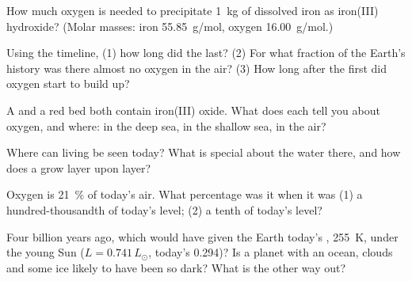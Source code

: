 \begin{exercise}[$\star\star$]\label{exo:g12:early-earth:7}
How much oxygen is needed to precipitate \qty{1}{kg} of dissolved iron as
iron(III) hydroxide? (Molar masses: iron \qty{55.85}{g/mol}, oxygen
\qty{16.00}{g/mol}.)
\end{exercise}

\begin{exercise}[$\star\star$]\label{exo:g12:early-earth:8}
Using the timeline, (1) how long did the  last? (2)
For what fraction of the Earth's history was there almost no oxygen in the
air? (3) How long after the first  did oxygen start to build up?
\end{exercise}

\begin{exercise}[$\star\star$]\label{exo:g12:early-earth:9}
A  and a red bed both contain iron(III) oxide. What
does each tell you about oxygen, and where: in the deep sea, in the shallow
sea, in the air?
\end{exercise}

\begin{exercise}[$\star\star$]\label{exo:g12:early-earth:10}
Where can living  be seen today? What is special about the
water there, and how does a  grow layer upon layer?
\end{exercise}

\begin{exercise}[$\star\star$]\label{exo:g12:early-earth:11}
Oxygen is \qty{21}{\percent} of today's air. What percentage was it when it
was (1) a hundred-thousandth of today's level; (2) a tenth of today's level?
\end{exercise}

\begin{exercise}[$\star\star\star$]\label{exo:g12:early-earth:12}
Four billion years ago, which  would have given the Earth today's
, \qty{255}{K}, under the young Sun ($L = 0.741\,L_\odot$,
today's  0.294)? Is a planet with an ocean, clouds and some ice likely
to have been so dark? What is the other way out?
\end{exercise}

